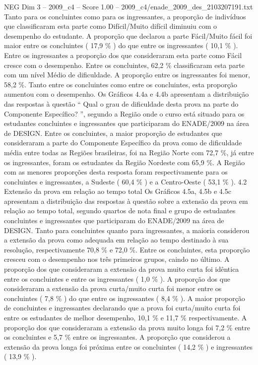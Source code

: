 \begin{textsample}{NEG Dim 3 – 2009\_c4 – Score 1.00 – 2009\_c4/enade\_2009\_des\_2103207191.txt}
Tanto para os concluintes como para os ingressantes, a proporção de indivíduos que classificaram esta parte como Difícil/Muito difícil diminuiu com o desempenho do estudante.
A proporção que declarou a parte Fácil/Muito fácil foi maior entre os concluintes ( 17,9 \% ) do que entre os ingressantes ( 10,1 \% ).
Entre os ingressantes a proporção dos que consideraram esta parte como Fácil cresce com o desempenho.
Entre os concluintes, 62,2 \% classificaram esta parte com um nível Médio de dificuldade.
A proporção entre os ingressantes foi menor, 58,2 \%.
Tanto entre os concluintes como entre os concluintes, esta proporção aumentou com o desempenho.
Os Gráficos 4.4a e 4.4b apresentam a distribuição das respostas à questão “ Qual o grau de dificuldade desta prova na parte do Componente Específico? ”, segundo a Região onde o curso está situado para os estudantes concluintes e ingressantes que participaram do ENADE/2009 na área de DESIGN.
Entre os concluintes, a maior proporção de estudantes que consideraram a parte do Componente Específico da prova como de dificuldade média entre todas as Regiões brasileiras, foi na Região Norte com 72,7 \%, já entre os ingressantes, foram os estudantes da Região Nordeste com 65,9 \%.
A Região com as menores proporções desta resposta foram respectivamente para os concluintes e ingressantes, a Sudeste ( 60,4 \% ) e a Centro-Oeste ( 53,1 \% ). 4.2 Extensão da prova em relação ao tempo total Os Gráficos 4.5a, 4.5b e 4.5c apresentam a distribuição das respostas à questão sobre a extensão da prova em relação ao tempo total, segundo quartos de nota final e grupo de estudantes concluintes e ingressantes que participaram do ENADE/2009 na área de DESIGN.
Tanto para concluintes quanto para ingressantes, a maioria considerou a extensão da prova como adequada em relação ao tempo destinado à sua resolução, respectivamente 70,8 \% e 72,0 \%.
Entre os concluintes, esta proporção cresceu com o desempenho nos três primeiros grupos, caindo no último.
A proporção dos que consideraram a extensão da prova muito curta foi idêntica entre os concluintes e entre os ingressantes ( 1,0 \% ).
A proporção dos que consideraram a extensão da prova curta/muito curta foi menor entre os concluintes ( 7,8 \% ) do que entre os ingressantes ( 8,4 \% ).
A maior proporção de concluintes e ingressantes declarando que a prova foi curta/muito curta foi entre os estudantes de melhor desempenho, 10,1 \% e 11,7 \% respectivamente.
A proporção dos que consideraram a extensão da prova muito longa foi 7,2 \% entre os concluintes e 5,7 \% entre os ingressantes.
A proporção que considerou a extensão da prova longa foi próxima entre os concluintes ( 14,2 \% ) e ingressantes ( 13,9 \% ).

\end{textsample}

